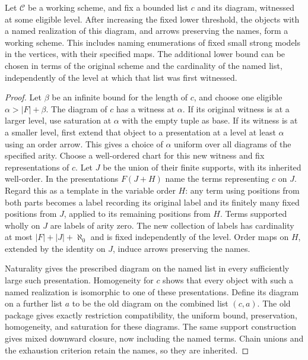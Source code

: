 \begin{proposition}
\label{lev:named-package}
Let $\mathcal C$ be a working scheme, and fix a bounded list $c$ and
its diagram, witnessed at some eligible level.  After increasing the
fixed lower threshold, the objects with a named realization of this
diagram, and arrows preserving the names, form a working scheme.
This includes naming enumerations of fixed small strong models in
the vertices, with their specified maps.  The additional lower bound
can be chosen in terms of the original scheme and the cardinality
of the named list, independently of the level at which that list
was first witnessed.
\end{proposition}

\begin{proof}
Let $\beta$ be an infinite bound for the length of $c$, and choose
one eligible $\alpha>|F|+\beta$.  The diagram of $c$ has a witness
at $\alpha$.  If its original witness is at a larger level, use
saturation at $\alpha$ with the empty tuple as base.  If its witness
is at a smaller level, first extend that object to a presentation
at a level at least $\alpha$ using an order arrow.  This gives a
choice of $\alpha$ uniform over all diagrams of the specified arity.
Choose a well-ordered chart for this new witness and fix
representations of $c$.  Let $J$ be the union of their finite supports, with its inherited
well-order.  In the presentations $F(J+H)$ name the terms representing
$c$ on $J$.  Regard this as a template in the variable order $H$:
any term using positions from both parts becomes a label recording
its original label and its finitely many fixed positions from $J$,
applied to its remaining positions from $H$.  Terms supported wholly
on $J$ are labels of arity zero.  The new collection of labels has
cardinality at most $|F|+|J|+\aleph_0$ and is fixed independently of
the level.  Order maps on $H$, extended by the identity on $J$,
induce arrows preserving the names.

Naturality gives the prescribed diagram on the named list in every
sufficiently large such presentation.  Homogeneity for $c$ shows
that every object with such a named realization is isomorphic to one
of these presentations.
Define its diagram on a further list $a$ to be the old diagram on
the combined list $(c,a)$.  The old package gives exactly restriction
compatibility, the uniform bound, preservation, homogeneity, and
saturation for these diagrams.  The same support construction gives
mixed downward closure, now including the named terms.  Chain unions
and the exhaustion criterion retain the names, so they are inherited.


\end{proof}
